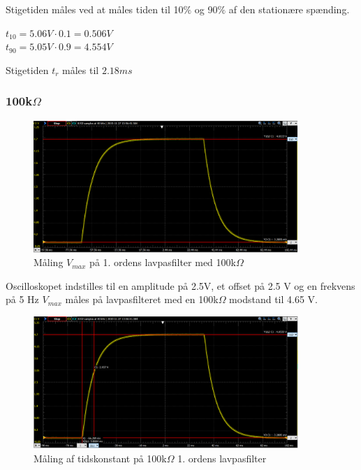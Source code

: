 Stigetiden måles ved at måles tiden til 10$\%$ og 90$\%$ af den stationære spænding.
\begin{center}
$t_{10}=5.06 V \cdot 0.1 = 0.506 V$
\\
$t_{90}=5.05 V \cdot 0.9 = 4.554 V$
\end{center}

Stigetiden $t_r$ måles til $2.18 ms$

\subsubsection{100k$\Omega$}

\begin{figure}[h!]
\begin{center}
\includegraphics[height=5cm]{E_Fig/Rea_1_100_max}
\caption{Måling $V_{max}$ på 1. ordens lavpasfilter med 100k$\Omega$}
\label{Rea_1_100_max}
\end{center}
\end{figure}

Oscilloskopet indstilles til en amplitude på 2.5V, et offset på 2.5 V og en frekvens på 5 Hz
$V_{max}$ måles på lavpasfilteret med en 100k$\Omega$ modstand til 4.65 V. 


\begin{figure}[h!]
\begin{center}
\includegraphics[height=5cm]{E_Fig/Rea_1_100_tidskonstant}
\caption{Måling af tidskonstant på 100k$\Omega$ 1. ordens lavpasfilter}
\label{Rea_1_100_tidskonstant}
\end{center}
\end{figure}

